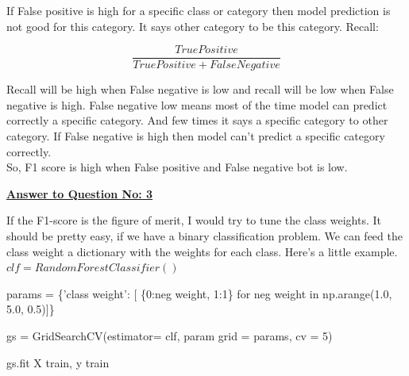 \documentclass[11pt]{article}
\begin{document}
If False positive is high for a specific class or category then model prediction is not
good for this category. It says other category to be this category. Recall:


\[
\frac{True Positive}{True Positive + False Negative}
\]


Recall will be high when False negative is low and recall will be low when False
negative is high. False negative low means most of the time model can predict correctly
a specific category. And few times it says a specific category to other category. If False
negative is high then model can’t predict a specific category correctly.
\\ 
So, F1 score is high when False positive and False negative bot is low.

\newpage
\begin{center}
\bf  \underline{Answer to Question No: 3} \\
\end{center} 

If the F1-score is the figure of merit, I would try to tune the class weights. It should be pretty
easy, if we have a binary classification problem. We can feed the class weight a dictionary with
the weights for each class. Here’s a little example.
\\
      

$clf = RandomForestClassifier()$ 

params = \{'class weight': [ \{0:neg weight, 1:1\} for neg weight in np.arange(1.0, 5.0, 0.5)]\}


gs = GridSearchCV(estimator= clf, param grid = params, cv = 5)

gs.fit X train, y train
\end{document}
